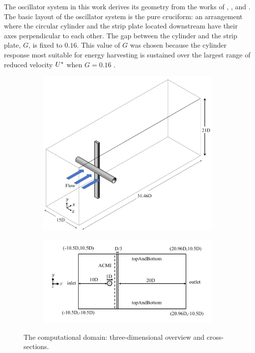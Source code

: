 \documentclass[oneside]{utmthesis}
\begin{document}
The oscillator system in this work derives its geometry from the works of \citet{Nguyen2012}, \citet{Koide2013}, and \citet{Koide2017}. The basic layout of the oscillator system is the pure cruciform: an arrangement where the circular cylinder and the strip plate located downstream have their axes perpendicular to each other. The gap between the cylinder and the strip plate, $G$, is fixed to $0.16$. This value of $G$ was chosen because the cylinder response most suitable for energy harvesting is sustained over the largest range of reduced velocity $U^{*}$ when $G = 0.16$ \citep{Koide2013}.

\begin{figure}
  \centering
  \begin{subfigure}[h]{0.95\textwidth}
    \includegraphics[width=\textwidth]{figs/threeDimensionalDomain}
    \caption{}
    \label{fig:threeDimDom}
  \end{subfigure}

  \begin{subfigure}[h]{1\textwidth}
    \includegraphics[width=\textwidth]{figs/problemGeometrySide}
    \caption{}
    \label{fig:probGeoSide}
  \end{subfigure}

  \caption{The computational domain: three-dimensional overview and cross-sections.}
\end{figure}
\end{document}
